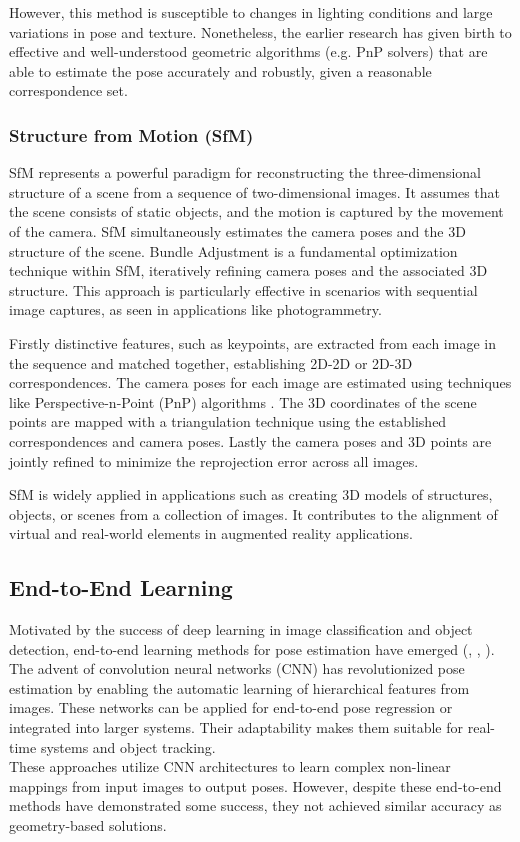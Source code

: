 However, this method is susceptible to changes in lighting conditions and large variations in pose and texture. Nonetheless, the earlier research has given birth to effective and well-understood geometric algorithms (e.g. PnP solvers) that are able to estimate the pose accurately and robustly, given a reasonable correspondence set.

\subsubsection{Structure from Motion (SfM)}
SfM \cite{SfM} represents a powerful paradigm for reconstructing the three-dimensional structure of a scene from a sequence of two-dimensional images. It assumes that the scene consists of static objects, and the motion is captured by the movement of the camera. SfM simultaneously estimates the camera poses and the 3D structure of the scene. Bundle Adjustment is a fundamental optimization technique within SfM, iteratively refining camera poses and the associated 3D structure. This approach is particularly effective in scenarios with sequential image captures, as seen in applications like photogrammetry.

Firstly distinctive features, such as keypoints, are extracted from each image in the sequence and matched together, establishing 2D-2D or 2D-3D correspondences. The camera poses for each image are estimated using techniques like Perspective-n-Point (PnP) algorithms \cite{Lepetit2009EPnPAA}. The 3D coordinates of the scene points are mapped with a triangulation technique using the established correspondences and camera poses. Lastly the camera poses and 3D points are jointly refined to minimize the reprojection error across all images.

SfM is widely applied in applications such as creating 3D models of structures, objects, or scenes from a collection of images. It contributes to the alignment of virtual and real-world elements in augmented reality applications.

\subsection{End-to-End Learning}
Motivated by the success of deep learning in image classification and object detection, end-to-end learning methods for pose estimation have emerged (\cite{E2E1}, \cite{E2E2}, \cite{E2E3}). The advent of convolution neural networks (CNN) has revolutionized pose estimation by enabling the automatic learning of hierarchical features from images. These networks can be applied for end-to-end pose regression or integrated into larger systems. Their adaptability makes them suitable for real-time systems and object tracking.\\
These approaches utilize CNN architectures to learn complex non-linear mappings from input images to output poses. However, despite these end-to-end methods have demonstrated some success, they not achieved similar accuracy as geometry-based solutions.

